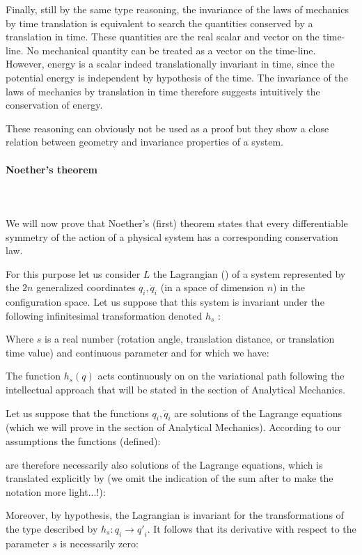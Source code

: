 	Finally, still by the same type reasoning, the invariance of the laws of mechanics by time translation is equivalent to search the quantities conserved by a translation in time. These quantities are the real scalar and vector on the time-line. No mechanical quantity can be treated as a vector on the time-line. However, energy is a scalar indeed translationally invariant in time, since the potential energy is independent by hypothesis of the time. The invariance of the laws of mechanics by translation in time therefore suggests intuitively the conservation of energy.

	These reasoning can obviously not be used as a proof but they show a close relation between geometry and invariance properties of a system.
	
	\paragraph{Noether's theorem}\mbox{}\\\\
	We will now prove that Noether's (first) theorem states that every differentiable symmetry of the action of a physical system has a corresponding conservation law.
	
	For this purpose let us consider $L$ the Lagrangian () of a system represented by the $2n$ generalized coordinates $q_i,\dot{q}_i$ (in a space of dimension $n$) in the configuration space. Let us suppose that this system is invariant under the following  infinitesimal transformation denoted $h_s$ :
	
	Where $s$ is a real number (rotation angle, translation distance, or translation time value) and continuous parameter and for which we have:
	
	The function $h_s(q)$ acts continuously on on the variational path following the intellectual approach that will be stated in the section of Analytical Mechanics.

	Let us suppose that the functions $q_i,\dot{q}_i$ are solutions of the Lagrange equations (which we will prove in the section of Analytical Mechanics). According to our assumptions the functions (defined):
	
	are therefore necessarily also solutions of the Lagrange equations, which is translated explicitly by (we omit the indication of the sum after to make the notation more light...!):
	
	Moreover, by hypothesis, the Lagrangian is invariant for the transformations of the type described by $h_s:q_i\rightarrow {q'}_i$. It follows that its derivative with respect to the parameter $s$ is necessarily zero:
	
